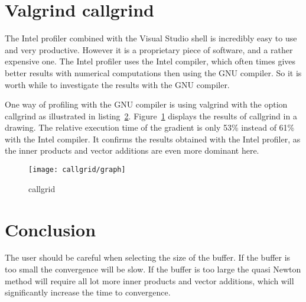 \section{Valgrind callgrind}
The Intel profiler combined with the Visual Studio shell is incredibly easy to use and very productive. However it is a proprietary piece of software, and a rather expensive one. The Intel profiler uses the Intel compiler, which often times gives better results with numerical computations then using the GNU compiler. So it is worth while to investigate the results with the GNU compiler.

One way of profiling with the GNU compiler is using valgrind with the option callgrind as illustrated in listing~\ref{}. Figure~\ref{fig:callgrid} displays the results of callgrind in a drawing. The relative execution time of the gradient is only 53\% instead of 61\% with the Intel compiler. It confirms the results obtained with the Intel profiler, as the inner products and vector additions are even more dominant here.

\begin{figure}[H]
	\centering
	\texttt{[image: callgrid/graph]}
	\caption{callgrid}
	\label{fig:callgrid}
\end{figure}

\section{Conclusion}
The user should be careful when selecting the size of the buffer. If the buffer is too small the convergence will be slow. If the buffer is too large the quasi Newton method will require all lot more inner products and vector additions, which will significantly increase the time to convergence.
